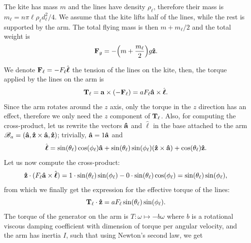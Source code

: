The kite has mass $m$ and the lines have density $\rho_\ell$, therefore their mass is $m_\ell = n \pi \ell \rho_\ell d_\ell^2 / 4$.
We assume that the kite lifts half of the lines, while the rest is supported by the arm.
The total flying mass is then $m + m_\ell/2$ and the total weight is
\begin{equation} \label{eq:f_grav_10D}
    \vb F_g = -\qty(m + \frac{m_\ell}{2}) g \vu z.
\end{equation}


We denote $\vb F_\ell = -F_\ell \hat{\boldsymbol{\ell}}$ the tension of the lines on the kite, then, the torque applied by the lines on the arm is
\begin{equation}
    \vb T_\ell = \vb a \times (- \vb F_\ell) = a F_\ell \vu a \times \hat{\boldsymbol{\ell}}.
\end{equation}
%
Since the arm rotates around the $z$ axis, only the torque in the $z$ direction has an effect, therefore we only need the $z$ component of $\vb T_\ell$.
Also, for computing the cross-product, let us rewrite the vectors $\vu a$ and $\hat{\boldsymbol{\ell}}$ in the base attached to the arm $\mathscr B_a = (\vu a, \vu z \times \vu a, \vu z)$; trivially, $\vu a = 1 \vu a$ and 
\begin{equation} \label{eq:lhat-10D}
    \hat{\boldsymbol{\ell}} = \sin(\theta_\ell) \cos(\phi_\ell) \vu a + \sin(\theta_\ell) \sin(\phi_\ell) (\vu z \times \vu a) + \cos(\theta_\ell) \vu z.
\end{equation}
%
Let us now compute the cross-product:
\begin{equation}
    \vu z \cdot (F_\ell \vu a \times \hat{\boldsymbol{\ell}}) = 1 \cdot \sin(\theta_\ell) \sin(\phi_\ell) - 0 \cdot \sin(\theta_\ell) \cos(\phi_\ell) = \sin(\theta_\ell) \sin(\phi_\ell),
\end{equation}
%
from which we finally get the expression for the effective torque of the lines:
\begin{equation}
    \vb T_\ell \cdot \vu z = a F_\ell \sin(\theta_\ell) \sin(\phi_\ell).
\end{equation}
%
The torque of the generator on the arm is $T : \omega \mapsto -b \omega$ where $b$ is a rotational viscous damping coefficient with dimension of torque per angular velocity, and the arm has inertia $I$, such that using Newton's second law, we get
